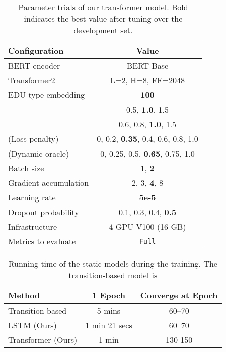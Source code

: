 \documentclass[11pt,a4paper]{article}
\begin{document}
\begin{table}[h]
  \centering
  \begin{adjustbox}{max width=1\linewidth}
    \begin{tabular}{lc}
      \toprule
      \textbf{Configuration} & \textbf{Value} \\
      \midrule
      BERT encoder & BERT-Base\\
      Transformer2 & L=2, H=8, FF=2048 \\
      EDU type embedding & \textbf{100} \\
       & 0.5, \textbf{1.0}, 1.5 \\
       & 0.6, 0.8, \textbf{1.0}, 1.5 \\
       (Loss penalty) & 0, 0.2, \textbf{0.35}, 0.4, 0.6, 0.8, 1.0 \\
       (Dynamic oracle) & 0, 0.25, 0.5, \textbf{0.65}, 0.75, 1.0 \\
      Batch size & 1, \textbf{2} \\
      Gradient accumulation & 2, 3, \textbf{4}, 8 \\
      Learning rate & \textbf{5e-5} \\
      Dropout probability & 0.1, 0.3, 0.4, \textbf{0.5} \\
      Infrastructure & 4 GPU V100 (16 GB) \\
      Metrics to evaluate & \texttt{Full} \\
      \bottomrule
    \end{tabular}
  \end{adjustbox}
  \caption{\label{app2} Parameter trials of our transformer model. Bold
    indicates the best value after tuning over the development set. }
\end{table}

\begin{table}[!h]
  \centering
  \begin{adjustbox}{max width=1\linewidth}
    \begin{tabular}{lcc}
      \toprule
      \textbf{Method} & \textbf{1 Epoch} & \textbf{Converge at Epoch}\\
      \midrule
      Transition-based & 5 mins & 60--70 \\
      LSTM (Ours) & 1 min 21 secs & 60--70 \\
      Transformer (Ours) & 1 min & 130-150 \\
      \bottomrule
    \end{tabular}
  \end{adjustbox}
  \caption{\label{app3} Running time of the static models during the training. The transition-based model is \citet{yu2018transition}}
\end{table}
\end{document}
